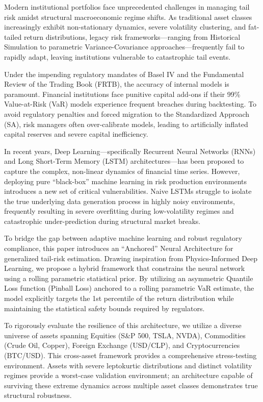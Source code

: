 
Modern institutional portfolios face unprecedented challenges in managing tail risk amidst structural macroeconomic regime shifts. As traditional asset classes increasingly exhibit non-stationary dynamics, severe volatility clustering, and fat-tailed return distributions, legacy risk frameworks---ranging from Historical Simulation to parametric Variance-Covariance approaches---frequently fail to rapidly adapt, leaving institutions vulnerable to catastrophic tail events.

Under the impending regulatory mandates of Basel IV and the Fundamental Review of the Trading Book (FRTB), the accuracy of internal models is paramount. Financial institutions face punitive capital add-ons if their 99\% Value-at-Risk (VaR) models experience frequent breaches during backtesting. To avoid regulatory penalties and forced migration to the Standardized Approach (SA), risk managers often over-calibrate models, leading to artificially inflated capital reserves and severe capital inefficiency. 

In recent years, Deep Learning---specifically Recurrent Neural Networks (RNNs) and Long Short-Term Memory (LSTM) architectures---has been proposed to capture the complex, non-linear dynamics of financial time series. However, deploying pure ``black-box'' machine learning in risk production environments introduces a new set of critical vulnerabilities. Naive LSTMs struggle to isolate the true underlying data generation process in highly noisy environments, frequently resulting in severe overfitting during low-volatility regimes and catastrophic under-prediction during structural market breaks.

To bridge the gap between adaptive machine learning and robust regulatory compliance, this paper introduces an ``Anchored'' Neural Architecture for generalized tail-risk estimation. Drawing inspiration from Physics-Informed Deep Learning, we propose a hybrid framework that constrains the neural network using a rolling parametric statistical prior. By utilizing an asymmetric Quantile Loss function (Pinball Loss) anchored to a rolling parametric VaR estimate, the model explicitly targets the 1st percentile of the return distribution while maintaining the statistical safety bounds required by regulators.

To rigorously evaluate the resilience of this architecture, we utilize a diverse universe of assets spanning Equities (S\&P 500, TSLA, NVDA), Commodities (Crude Oil, Copper), Foreign Exchange (USD/CLP), and Cryptocurrencies (BTC/USD). This cross-asset framework provides a comprehensive stress-testing environment. Assets with severe leptokurtic distributions and distinct volatility regimes provide a worst-case validation environment; an architecture capable of surviving these extreme dynamics across multiple asset classes demonstrates true structural robustness.


